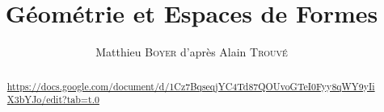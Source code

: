 \documentclass[french, math, info]{mpb-cours}
\title{Géométrie et Espaces de Formes}
\author{Matthieu \textsc{Boyer} d'après Alain \textsc{Trouvé}}
\begin{document}
\bettertitle

\begin{abstract}
	\url{https://docs.google.com/document/d/1Cz7BqseqjYC4Td87QOUvoGTeI0Fyy8qWY9yIiX3bYJo/edit?tab=t.0}
\end{abstract}


\end{document}
